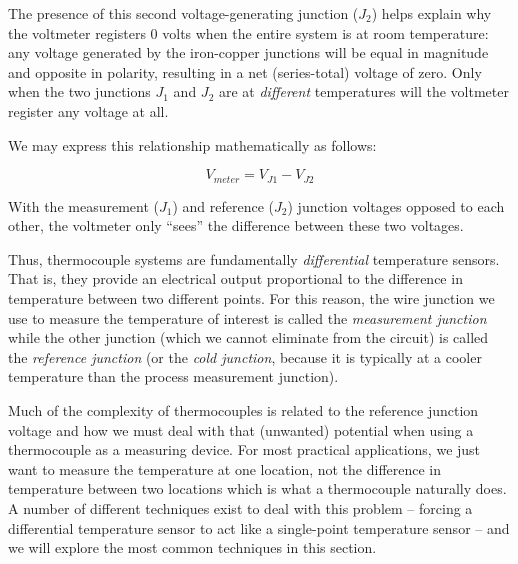 The presence of this second voltage-generating junction ($J_2$) helps explain why the voltmeter registers 0 volts when the entire system is at room temperature: any voltage generated by the iron-copper junctions will be equal in magnitude and opposite in polarity, resulting in a net (series-total) voltage of zero.  Only when the two junctions $J_1$ and $J_2$ are at \textit{different} temperatures will the voltmeter register any voltage at all. 

\filbreak

We may express this relationship mathematically as follows:

$$V_{meter} = V_{J1} - V_{J2}$$

With the measurement ($J_1$) and reference ($J_2$) junction voltages opposed to each other, the voltmeter only ``sees'' the difference between these two voltages.

Thus, thermocouple systems are fundamentally \textit{differential} temperature sensors.  That is, they provide an electrical output proportional to the difference in temperature between two different points.  For this reason, the wire junction we use to measure the temperature of interest is called the \textit{measurement junction} while the other junction (which we cannot eliminate from the circuit) is called the \textit{reference junction} (or the \textit{cold junction}, because it is typically at a cooler temperature than the process measurement junction).    

\vskip 10pt

Much of the complexity of thermocouples is related to the reference junction voltage and how we must deal with that (unwanted) potential when using a thermocouple as a measuring device.  For most practical applications, we just want to measure the temperature at one location, not the difference in temperature between two locations which is what a thermocouple naturally does.  A number of different techniques exist to deal with this problem -- forcing a differential temperature sensor to act like a single-point temperature sensor -- and we will explore the most common techniques in this section.

